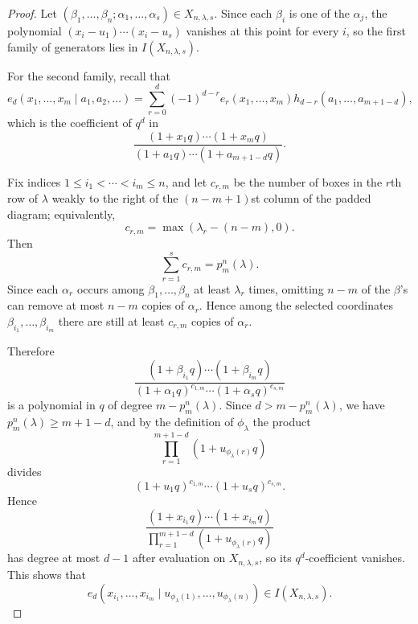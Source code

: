 \documentclass[10pt,a4paper]{amsart}
\begin{document}
\begin{proof}
    Let $(\beta_1,\dots,\beta_n;\alpha_1,\dots,\alpha_s)\in X_{n,\lambda,s}$.
    Since each $\beta_i$ is one of the $\alpha_j$, the polynomial
    $(x_i-u_1)\cdots(x_i-u_s)$ vanishes at this point for every $i$, so the
    first family of generators lies in $I(X_{n,\lambda,s})$.

    For the second family, recall that
    \[
    e_d(x_1,\dots,x_m\mid a_1,a_2,\dots)
    =\sum_{r=0}^d (-1)^{d-r} e_r(x_1,\dots,x_m)h_{d-r}(a_1,\dots,a_{m+1-d}),
    \]
    which is the coefficient of $q^d$ in
    \[
    \frac{(1+x_1q)\cdots(1+x_mq)}{(1+a_1q)\cdots(1+a_{m+1-d}q)}.
    \]

    Fix indices $1\leq i_1<\cdots<i_m\leq n$, and let $c_{r,m}$ be the number of
    boxes in the $r$th row of $\lambda$ weakly to the right of the
    $(n-m+1)$st column of the padded diagram; equivalently,
    \[
    c_{r,m}=\max(\lambda_r-(n-m),0).
    \]
    Then
    \[
    \sum_{r=1}^s c_{r,m}=p_m^n(\lambda).
    \]
    Since each $\alpha_r$ occurs among $\beta_1,\dots,\beta_n$ at least
    $\lambda_r$ times, omitting $n-m$ of the $\beta$'s can remove at most $n-m$
    copies of $\alpha_r$. Hence among the selected coordinates
    $\beta_{i_1},\dots,\beta_{i_m}$ there are still at least $c_{r,m}$ copies of
    $\alpha_r$.

    Therefore
    \[
    \frac{(1+\beta_{i_1}q)\cdots(1+\beta_{i_m}q)}
    {(1+\alpha_1 q)^{c_{1,m}}\cdots (1+\alpha_s q)^{c_{s,m}}}
    \]
    is a polynomial in $q$ of degree $m-p_m^n(\lambda)$. Since
    $d>m-p_m^n(\lambda)$, we have $p_m^n(\lambda)\geq m+1-d$, and by the
    definition of $\phi_\lambda$ the product
    \[
    \prod_{r=1}^{m+1-d} (1+u_{\phi_\lambda(r)}q)
    \]
    divides
    \[
    (1+u_1q)^{c_{1,m}}\cdots (1+u_sq)^{c_{s,m}}.
    \]
    Hence
    \[
    \frac{(1+x_{i_1}q)\cdots(1+x_{i_m}q)}
    {\prod_{r=1}^{m+1-d}(1+u_{\phi_\lambda(r)}q)}
    \]
    has degree at most $d-1$ after evaluation on $X_{n,\lambda,s}$, so its
    $q^d$-coefficient vanishes. This shows that
    \[
    e_d(x_{i_1},\dots,x_{i_m}\mid u_{\phi_\lambda(1)},\dots,u_{\phi_\lambda(n)})
    \in I(X_{n,\lambda,s}).
    \]
\end{proof}
\end{document}
